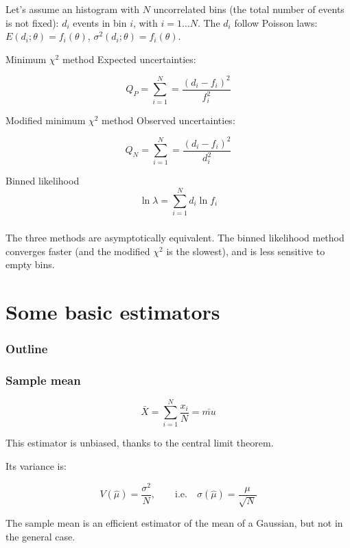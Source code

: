 \documentclass[9pt]{beamer}
\begin{document}
\begin{frame}
 \frametitle{}
 
 Let's assume an histogram with $N$ uncorrelated bins (the total number of events is not fixed): $d_i$ events in bin $i$, with $i = 1 \dots N$. The $d_i$ follow Poisson laws: $E(d_i;\theta) = f_i(\theta)$,
 $\sigma^2(d_i;\theta) = f_i(\theta)$.
 
 \begin{block}{Minimum $\chi^2$ method}
 Expected uncertainties: 
 
  $$Q_P = \sum_{i=1}^N = \frac{\left(d_i - f_i\right)^2}{f_i^2}$$
 \end{block}
 
 \begin{block}{Modified minimum $\chi^2$ method}
 Observed uncertainties:
 
  $$Q_N = \sum_{i=1}^N = \frac{\left(d_i - f_i\right)^2}{d_i^2}$$
 \end{block}
 
 \begin{block}{Binned likelihood}
  $$\ln \lambda = \sum_{i=1}^N d_i \ln f_i$$
 \end{block}



\end{frame}

\begin{frame}
 \frametitle{}
 
 The three methods are asymptotically equivalent. The binned likelihood method converges faster (and the modified $\chi^2$ is the slowest), and is less sensitive to empty bins. 
\end{frame}

\section{Some basic estimators}


\begin{frame}
 \frametitle{Outline}
 
 \tableofcontents[current]
\end{frame}

\begin{frame}
 \frametitle{Sample mean}
 
 $$\bar{X} = \sum_{i=1}^N \frac{x_i}{N} = \bar{mu}$$
 
 This estimator is unbiased, thanks to the central limit theorem.
 
 Its variance is:
 
 $$V(\hat{\mu}) = \frac{\sigma^2}{N},\qquad\text{i.e.}\quad \sigma(\hat{\mu}) = \frac{\mu}{\sqrt{N}}$$
 
 The sample mean is an efficient estimator of the mean of a Gaussian, but not in the general case.
\end{frame}
\end{document}

